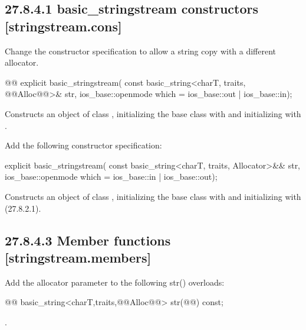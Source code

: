 \documentclass[ebook,11pt,article]{memoir}
\begin{document}
\subsection{27.8.4.1 basic\_stringstream constructors [stringstream.cons]}
Change the constructor specification to allow a string copy with a different allocator.
\begin{itemdecl}
@@
explicit basic_stringstream(
  const basic_string<charT, traits, @@Alloc@@>& str,
  ios_base::openmode which = ios_base::out | ios_base::in);
\end{itemdecl}

\begin{itemdescr}
\pnum
\effects
Constructs an object of class
,
initializing the base class with
and initializing
with
.
\end{itemdescr}

Add the following constructor specification:
\begin{insrt}
\begin{itemdecl}
explicit basic_stringstream(
  const basic_string<charT, traits, Allocator>&& str,
  ios_base::openmode which = ios_base::in | ios_base::out);
\end{itemdecl}
\begin{itemdescr}
\pnum
\effects Constructs an object of class , initializing the base class with  and initializing  with  (27.8.2.1).
\end{itemdescr}
\end{insrt}

\subsection{27.8.4.3 Member functions [stringstream.members]}
Add the allocator parameter to the following str() overloads:
\begin{itemdecl}
@@
basic_string<charT,traits,@@Alloc@@> str(@@) const;
\end{itemdecl}
\begin{itemdescr}
\pnum
\returns
{}.
\end{itemdescr}
\end{document}
